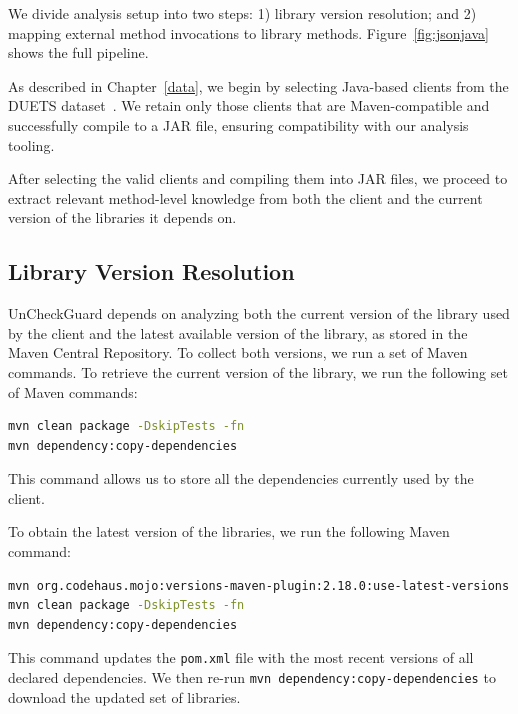 We divide analysis setup into two steps: 1) library version resolution; and 2) mapping external method invocations to library methods. Figure~\ref{fig:jsonjava} shows the full pipeline.

As described in Chapter~\ref{data}, we begin by selecting Java-based clients from the DUETS dataset~\cite{durieux21:_duets}. We retain only those clients that are Maven-compatible and successfully compile to a JAR file, ensuring compatibility with our analysis tooling.

After selecting the valid clients and compiling them into JAR files, we proceed to extract relevant method-level knowledge from both the client and the current version of the libraries it depends on.

\subsection{Library Version Resolution}


UnCheckGuard depends on analyzing both the current version of the library used by the client and the latest available version of the library, as stored in the Maven Central Repository. To collect both versions, we run a set of Maven commands. To retrieve the current version of the library, we run the following set of Maven commands:

\begin{lstlisting}[language=bash]
mvn clean package -DskipTests -fn
mvn dependency:copy-dependencies
\end{lstlisting}

This command allows us to store all the dependencies currently used by the client.

To obtain the latest version of the libraries, we run the following Maven command:
\begin{lstlisting}[language=bash]
mvn org.codehaus.mojo:versions-maven-plugin:2.18.0:use-latest-versions
mvn clean package -DskipTests -fn
mvn dependency:copy-dependencies
\end{lstlisting}
This command updates the \texttt{pom.xml} file with the most recent versions of all declared dependencies. We then re-run \texttt{mvn dependency:copy-dependencies} to download the updated set of libraries.

